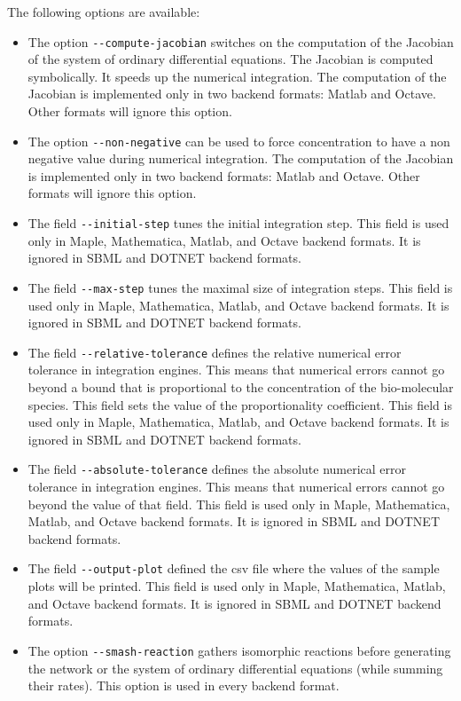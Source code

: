 \documentclass[11pt]{book}
\begin{document}
The following options are available:
\begin{itemize}
  \item The option \texttt{-{}-compute-jacobian} switches on the computation of the Jacobian of the system of ordinary differential equations.
  The Jacobian is computed symbolically. It speeds up the numerical integration. The computation of the Jacobian is implemented only in two backend formats:  Matlab and Octave. Other formats will ignore this option.
  \item The option \texttt{-{}-non-negative} can be used to force concentration to have a non negative value during numerical integration.
  The computation of the Jacobian is implemented only in two backend formats:  Matlab and Octave. Other formats will ignore this option.
  \item The field \texttt{-{}-initial-step} tunes the initial integration step.
  This field is used only in Maple, Mathematica, Matlab, and Octave backend formats.
  It is ignored in SBML and DOTNET backend formats.
  \item The field \texttt{-{}-max-step} tunes the maximal size of integration steps. This field is used only in Maple, Mathematica, Matlab, and Octave backend formats.
  It is ignored in SBML and DOTNET backend formats.
  \item The field \texttt{-{}-relative-tolerance} defines the relative numerical error tolerance in integration engines. This means that numerical errors cannot go beyond a bound that is proportional to the concentration of the bio-molecular species. This field sets the value of the proportionality coefficient.   This field is used only in Maple, Mathematica, Matlab, and Octave backend formats.
  It is ignored in SBML and DOTNET backend formats.
  \item The field \texttt{-{}-absolute-tolerance} defines the absolute numerical error tolerance in integration engines. This means that numerical errors cannot go beyond the value of that field.  This field is used only in Maple, Mathematica, Matlab, and Octave backend formats. It is ignored in SBML and DOTNET backend formats.
  \item The field \texttt{-{}-output-plot} defined the csv file where the values of the sample plots will be printed. This field is used only in Maple, Mathematica, Matlab, and Octave backend formats.
  It is ignored in SBML and DOTNET backend formats.
  \item The option \texttt{-{}-smash-reaction} gathers isomorphic reactions before generating the network or the system of ordinary differential equations (while summing their rates). This option is used in every backend format.

\end{itemize}
\end{document}
